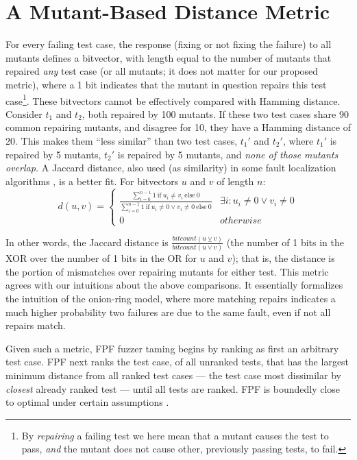 \section{A Mutant-Based Distance Metric}

For every failing test case, the response (fixing or not fixing the
failure) to all mutants defines a bitvector, with
length equal to the number of mutants that repaired \emph{any} test
case (or all mutants; it does not matter for our proposed metric),
where a 1 bit indicates that the mutant in question repairs this test
case\footnote{By \emph{repairing} a failing test we here mean that a mutant
causes the test to pass, \emph{and} the mutant does not cause
other, previously passing tests, to fail.}.  These bitvectors cannot be effectively compared with Hamming distance. Consider $t_1$ and $t_2$, both repaired
by 100 mutants.  If these two test cases share 90 common repairing
mutants, and disagree for 10, they have a Hamming
distance of 20.  This makes them ``less similar'' than two test cases,
$t_1'$ and $t_2'$, where $t_1'$ is repaired by 5 mutants, $t_2'$ is
repaired by 5 mutants, and \emph{none of those mutants overlap.}   A Jaccard distance, also used (as similarity) in some fault
localization algorithms \cite{Pinpoint}, is a better fit.  For bitvectors $u$ and $v$ of length $n$:
\[d(u,v) = 
\begin{cases}
\frac{\sum_{i=0}^{n-1} 1\ \text{if}\ u_i \neq v_i\ \text{else}\ 0}{\sum_{i=0}^{n-1} 1
\  \text{if}\ u_i \neq 0 \vee v_i \neq 0\ \text{else}\ 0} & \exists i:u_i\neq 0 \vee v_i\neq 0\\
0 & otherwise
\end{cases}
\]

\noindent In other words, the Jaccard distance is $\frac{\mathit{bitcount}(u
\veebar v)}{\mathit{bitcount}(u \vee v)}$ (the number of 1 bits in the
XOR over the number of 1 bits in the OR for $u$ and $v$); that is, the
distance is the portion of mismatches over repairing mutants for
either test.  This metric agrees with our intuitions about the above comparisons.  It
essentially formalizes the intuition of the onion-ring model, where
more matching repairs indicates a much higher probability two failures
are due to the same fault, even if not all repairs match.

Given such a metric, FPF \cite{Gonzalez} fuzzer taming \cite{PLDI13}
begins by ranking as first an arbitrary test case.   FPF next ranks the test
case, of all unranked tests, that has the largest minimum distance
from all ranked test cases --- the test case most dissimilar by \emph{closest}
already ranked test --- until all tests are ranked.  FPF is boundedly close
to optimal under certain assumptions \cite{Gonzalez}.

